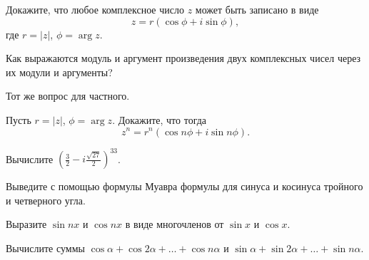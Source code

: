 \documentclass[a4paper, 12pt, num=21, date=02.09.2019]{listok}
\begin{document}
\begin{problem}
	Докажите, что любое комплексное число $z$ может быть записано в виде
	\[
		z = r(\cos \phi + i \sin \phi),
	\]
	где $r = |z|$, $\phi = \arg z$.
\end{problem}
\begin{problem}
\begin{probparts}
	\item Как выражаются модуль и аргумент произведения двух комплексных чисел через их модули и аргументы?
	\item Тот же вопрос для частного.
\end{probparts}
\end{problem}
\begin{problem}
	Пусть $r = |z|$, $\phi = \arg z$.
	Докажите, что тогда
	\[
		z^n = r^n (\cos{n\phi} + i \sin{n\phi}).
	\]
\end{problem}
\begin{problem}
	Вычислите ${\left ( \frac 3 2 - i \frac{\sqrt{27}}2 \right )}^{33}$.
\end{problem}
\begin{problem}
\begin{probparts}
	\item Выведите с помощью формулы Муавра формулы для синуса и косинуса тройного и четверного угла.
	\item Выразите $\sin{nx}$ и $\cos{nx}$ в виде многочленов от $\sin x$ и $\cos x$.
\end{probparts}
\end{problem}
\begin{problem}
	Вычислите суммы $\cos \alpha + \cos{2\alpha} + \ldots + \cos{n\alpha}$ и $\sin \alpha + \sin{2\alpha} + \ldots + \sin{n\alpha}$.
\end{problem}
\end{document}
